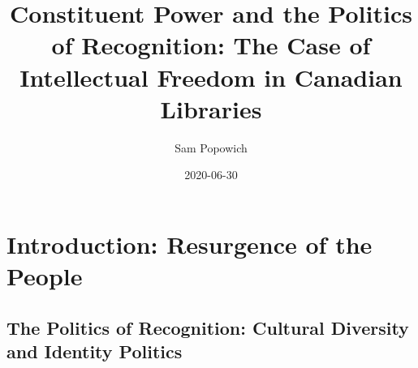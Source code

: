 \documentclass[12pt,oneside]{memoir}
\title{Constituent Power and the Politics of Recognition: The Case of Intellectual Freedom in Canadian Libraries}
\author{Sam Popowich}
\date{2020-06-30}
\begin{document}
\maketitle
\clearpage


\tableofcontents


\newpage
\setcounter{page}{1}

\mainmatter

\chapter{Introduction: Resurgence of the People}
\label{scrivauto:5}

\section{The Politics of Recognition: Cultural Diversity and Identity Politics}
\label{scrivauto:6}
\end{document}
